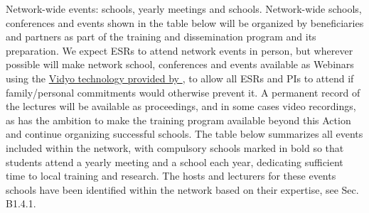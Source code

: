 \noindent \color{blue}Network-wide events: schools, yearly meetings and schools. \color{black}
Network-wide schools, conferences and events shown in the table below will be organized by \acronym beneficiaries and partners as part of the training and dissemination program and its preparation. 
We expect ESRs to attend network events in person, but wherever possible will make network school, conferences and events available as Webinars using the \href{http://information-technology.web.cern.ch/services/fe/vidyo}{Vidyo technology provided by \cernentity}, to allow all \acronym ESRs and PIs to attend if family/personal commitments would otherwise prevent it. 
A permanent record of the lectures will be available as proceedings, and in some cases video recordings, as \acronym has the ambition to make the training program available beyond this Action and continue organizing successful schools. 
The table below summarizes all events included within the network, with compulsory schools marked in bold so that students attend a yearly meeting and a school each year, dedicating sufficient time to local training and research. 
The hosts and lecturers for these events schools have been identified within the network based on their expertise, see Sec. B1.4.1. 

